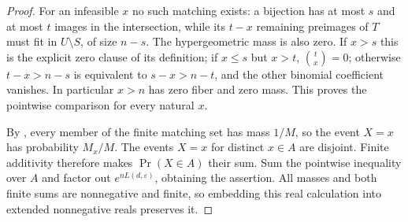 \begin{proof}
For an infeasible $x$ no such matching exists: a bijection has at most
$s$ and at most $t$ images in the intersection, while its $t-x$ remaining
preimages of $T$ must fit in $U\setminus S$, of size $n-s$.
The hypergeometric mass is also zero. If $x>s$ this is the explicit
zero clause of its definition; if $x\le s$ but $x>t$, $\binom t x=0$;
otherwise $t-x>n-s$ is equivalent to $s-x>n-t$, and the other binomial
coefficient vanishes. In particular $x>n$ has zero fiber and zero mass.
This proves the pointwise comparison for every natural $x$.

By , every member of the finite matching
set has mass $1/M$, so the event $X=x$ has probability $M_x/M$.
The events $X=x$ for distinct $x\in A$ are disjoint. Finite additivity
therefore makes $\Pr(X\in A)$ their sum. Sum the pointwise inequality
over $A$ and factor out $e^{nL(d,\varepsilon)}$, obtaining the assertion.
All masses and both finite sums are nonnegative and finite, so embedding
this real calculation into extended nonnegative reals preserves it.
\end{proof}
